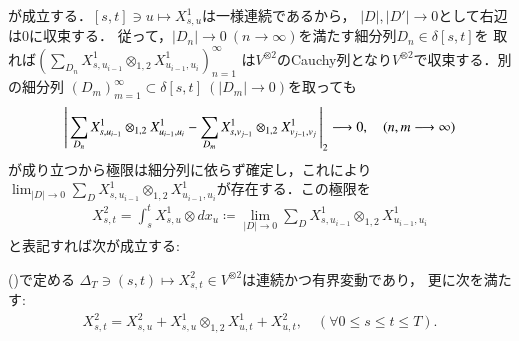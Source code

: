 	が成立する．$[s,t] \ni u \longmapsto X^1_{s,u}$は一様連続であるから，
	$|D|,|D'|\longrightarrow 0$として右辺は0に収束する．
	従って，$|D_n| \longrightarrow 0\ (n \longrightarrow \infty)$を満たす細分列$D_n \in \delta[s,t]$を
	取れば$\left(\sum_{D_n} X^1_{s,u_{i-1}} \otimes_{1,2} X^1_{u_{i-1},u_i} \right)_{n=1}^{\infty}$
	は$V^{\otimes 2}$のCauchy列となり$V^{\otimes 2}$で収束する．別の細分列
	$(D_m)_{m=1}^{\infty} \subset \delta[s,t]\ (|D_m| \longrightarrow 0)$を取っても
	\begin{align}
		\left|\,  \sum_{D_n} X^1_{s,u_{i-1}} \otimes_{1,2} X^1_{u_{i-1},u_i} - 
			\sum_{D_m} X^1_{s,v_{j-1}} \otimes_{1,2} X^1_{v_{j-1},v_j}\, \right|_{2}
		\longrightarrow 0,
		\quad (n,m \longrightarrow \infty)
	\end{align}
	が成り立つから極限は細分列に依らず確定し，これにより
	$\lim_{|D| \to 0} \sum_{D} X^1_{s,u_{i-1}} \otimes_{1,2} X^1_{u_{i-1},u_i}$が存在する．この極限を
	\begin{align}
		X^2_{s,t} = \int_s^t X^1_{s,u} \otimes d x_u \coloneqq 
		\lim_{|D| \to 0} \sum_{D} X^1_{s,u_{i-1}} \otimes_{1,2} X^1_{u_{i-1},u_i}
		\label{eq:signature_of_path_1}
	\end{align}
	と表記すれば次が成立する:
	
	\begin{screen}
		\begin{thm}
			()で定める
			$\Delta_T \ni (s,t) \longmapsto X^2_{s,t} \in V^{\otimes 2}$は連続かつ有界変動であり，
			更に次を満たす:
			\begin{align}
				X^2_{s,t} = X^2_{s,u} + X^1_{s,u} \otimes_{1,2} X^1_{u,t} + X^2_{u,t},
				\quad (\forall 0 \leq s \leq t \leq T).
				\label{eq:signature_of_path_2}
			\end{align}
		\end{thm}
	\end{screen}
	
